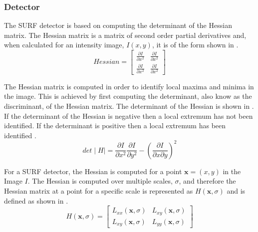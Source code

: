 \documentclass[11pt]{report}
\begin{document}
\subsubsection{Detector}
\label{2dsurfdetect}
The SURF detector is based on computing the determinant of the Hessian matrix. The Hessian matrix is a matrix of second order partial derivatives and, when calculated for an intensity image,  $I(x,y)$, it is of the form shown in .\\

\begin{equation}
Hessian = \left[ \begin{array}{cc} \frac{\partial I}{\partial x^2} & \frac{\partial I}{\partial x^2}\\
					    \frac{\partial I}{\partial x^2} & \frac{\partial I}{\partial x^2}\end{array} \right]
\label{eqn:hessian}
\end{equation}

The Hessian matrix is computed in order to identify local maxima and minima in the image. This is achieved by first computing the determinant, also know as the discriminant, of the Hessian matrix. The determinant of the Hessian is shown in . If the determinant of the Hessian is negative then a local extremum has not been identified. If the determinant is positive then a local extremum has been identified \cite{Evans2009}. \\

\begin{equation}
det\mid H \mid = \frac{\partial I}{\partial x^2} \frac{\partial I}{\partial y^2} - (\frac{\partial I}{\partial x \partial y})^2
\label{eqn:determinant}
\end{equation}

For a SURF detector, the Hessian is computed for a point $\textbf{x} = (x,y)$ in the Image $I$. The Hessian is computed over multiple scales, $\sigma$, and therefore the Hessian matrix at a point for a specific scale is represented as $H(\textbf{x}, \sigma)$ \cite{Lowe2004} and is defined as shown in .\\


\begin{equation}
H(\textbf{x}, \sigma) = \left[ \begin{array}{cc} L_{xx}(\textbf{x}, \sigma) & L_{xy}(\textbf{x}, \sigma)\\
					    L_{xy}(\textbf{x}, \sigma) & L_{yy}(\textbf{x}, \sigma)\end{array} \right]
\label{eqn:hessianScale}
\end{equation}
\end{document}
